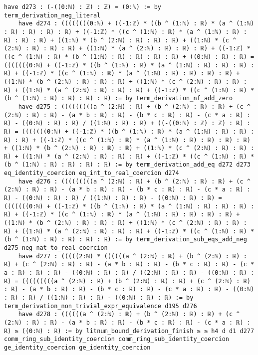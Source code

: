 \documentclass{article}
\begin{document}
\begin{tcolorbox}[colback=white!10, width=\linewidth]
\begin{lstlisting}[language=Lean4]
    have d273 : (-((0:ℕ) : ℤ) : ℤ) = (0:ℕ) := by term_derivation_neg_literal
    have d274 : ((((((((0:ℕ) + ((-1:ℤ) * ((b ^ (1:ℕ) : ℝ) * (a ^ (1:ℕ) : ℝ) : ℝ) : ℝ) : ℝ) + ((-1:ℤ) * ((c ^ (1:ℕ) : ℝ) * (a ^ (1:ℕ) : ℝ) : ℝ) : ℝ) : ℝ) + ((1:ℕ) * (b ^ (2:ℕ) : ℝ) : ℝ) : ℝ) + ((1:ℕ) * (c ^ (2:ℕ) : ℝ) : ℝ) : ℝ) + ((1:ℕ) * (a ^ (2:ℕ) : ℝ) : ℝ) : ℝ) + ((-1:ℤ) * ((c ^ (1:ℕ) : ℝ) * (b ^ (1:ℕ) : ℝ) : ℝ) : ℝ) : ℝ) + ((0:ℕ) : ℝ) : ℝ) = (((((((0:ℕ) + ((-1:ℤ) * ((b ^ (1:ℕ) : ℝ) * (a ^ (1:ℕ) : ℝ) : ℝ) : ℝ) : ℝ) + ((-1:ℤ) * ((c ^ (1:ℕ) : ℝ) * (a ^ (1:ℕ) : ℝ) : ℝ) : ℝ) : ℝ) + ((1:ℕ) * (b ^ (2:ℕ) : ℝ) : ℝ) : ℝ) + ((1:ℕ) * (c ^ (2:ℕ) : ℝ) : ℝ) : ℝ) + ((1:ℕ) * (a ^ (2:ℕ) : ℝ) : ℝ) : ℝ) + ((-1:ℤ) * ((c ^ (1:ℕ) : ℝ) * (b ^ (1:ℕ) : ℝ) : ℝ) : ℝ) : ℝ) := by term_derivation_nf_add_zero
    have d275 : (((((((((a ^ (2:ℕ) : ℝ) + (b ^ (2:ℕ) : ℝ) : ℝ) + (c ^ (2:ℕ) : ℝ) : ℝ) - (a * b : ℝ) : ℝ) - (b * c : ℝ) : ℝ) - (c * a : ℝ) : ℝ) - ((0:ℕ) : ℝ) : ℝ) / ((1:ℕ) : ℝ) : ℝ) + ((-((0:ℕ) : ℤ) : ℤ) : ℝ) : ℝ) = (((((((0:ℕ) + ((-1:ℤ) * ((b ^ (1:ℕ) : ℝ) * (a ^ (1:ℕ) : ℝ) : ℝ) : ℝ) : ℝ) + ((-1:ℤ) * ((c ^ (1:ℕ) : ℝ) * (a ^ (1:ℕ) : ℝ) : ℝ) : ℝ) : ℝ) + ((1:ℕ) * (b ^ (2:ℕ) : ℝ) : ℝ) : ℝ) + ((1:ℕ) * (c ^ (2:ℕ) : ℝ) : ℝ) : ℝ) + ((1:ℕ) * (a ^ (2:ℕ) : ℝ) : ℝ) : ℝ) + ((-1:ℤ) * ((c ^ (1:ℕ) : ℝ) * (b ^ (1:ℕ) : ℝ) : ℝ) : ℝ) : ℝ) := by term_derivation_add_eq d272 d273 eq_identity_coercion eq_int_to_real_coercion d274
    have d276 : (((((((((a ^ (2:ℕ) : ℝ) + (b ^ (2:ℕ) : ℝ) : ℝ) + (c ^ (2:ℕ) : ℝ) : ℝ) - (a * b : ℝ) : ℝ) - (b * c : ℝ) : ℝ) - (c * a : ℝ) : ℝ) - ((0:ℕ) : ℝ) : ℝ) / ((1:ℕ) : ℝ) : ℝ) - ((0:ℕ) : ℝ) : ℝ) = (((((((0:ℕ) + ((-1:ℤ) * ((b ^ (1:ℕ) : ℝ) * (a ^ (1:ℕ) : ℝ) : ℝ) : ℝ) : ℝ) + ((-1:ℤ) * ((c ^ (1:ℕ) : ℝ) * (a ^ (1:ℕ) : ℝ) : ℝ) : ℝ) : ℝ) + ((1:ℕ) * (b ^ (2:ℕ) : ℝ) : ℝ) : ℝ) + ((1:ℕ) * (c ^ (2:ℕ) : ℝ) : ℝ) : ℝ) + ((1:ℕ) * (a ^ (2:ℕ) : ℝ) : ℝ) : ℝ) + ((-1:ℤ) * ((c ^ (1:ℕ) : ℝ) * (b ^ (1:ℕ) : ℝ) : ℝ) : ℝ) : ℝ) := by term_derivation_sub_eqs_add_neg d275 neg_nat_to_real_coercion
    have d277 : (((((2:ℕ) * ((((((a ^ (2:ℕ) : ℝ) + (b ^ (2:ℕ) : ℝ) : ℝ) + (c ^ (2:ℕ) : ℝ) : ℝ) - (a * b : ℝ) : ℝ) - (b * c : ℝ) : ℝ) - (c * a : ℝ) : ℝ) : ℝ) - ((0:ℕ) : ℝ) : ℝ) / ((2:ℕ) : ℝ) : ℝ) - ((0:ℕ) : ℝ) : ℝ) = (((((((((a ^ (2:ℕ) : ℝ) + (b ^ (2:ℕ) : ℝ) : ℝ) + (c ^ (2:ℕ) : ℝ) : ℝ) - (a * b : ℝ) : ℝ) - (b * c : ℝ) : ℝ) - (c * a : ℝ) : ℝ) - ((0:ℕ) : ℝ) : ℝ) / ((1:ℕ) : ℝ) : ℝ) - ((0:ℕ) : ℝ) : ℝ) := by term_derivation_non_trivial_expr_equivalence d195 d276
    have d278 : ((((((a ^ (2:ℕ) : ℝ) + (b ^ (2:ℕ) : ℝ) : ℝ) + (c ^ (2:ℕ) : ℝ) : ℝ) - (a * b : ℝ) : ℝ) - (b * c : ℝ) : ℝ) - (c * a : ℝ) : ℝ) ≥ ((0:ℕ) : ℝ) := by litnum_bound_derivation_finish ≥ ≥ h4 d d1 d277 comm_ring_sub_identity_coercion comm_ring_sub_identity_coercion ge_identity_coercion ge_identity_coercion

\end{lstlisting}
\end{tcolorbox}
\end{document}
